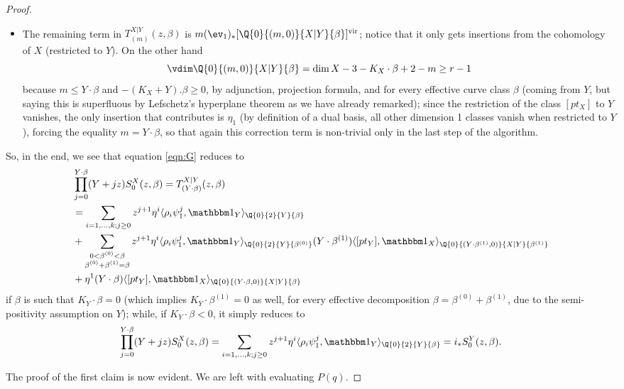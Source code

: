 \begin{proof}
\begin{itemize}[leftmargin=*]
\item The remaining term in $T_{(m)}^{X|Y}(z,\beta)$ is $m(\ev_1)_*[\Q{0}{(m,0)}{X|Y}{\beta}]^\text{vir}$; notice that it only gets insertions from the cohomology of $X$ (restricted to $Y$). On the other hand
\[
 \vdim \Q{0}{(m,0)}{X|Y}{\beta}=\dim X-3 -K_X \cdot \beta +2-m \geq r-1
\]
because $m\leq Y\cdot\beta$ and $-(K_X+Y).\beta\geq 0$, by adjunction, projection formula, and for every effective curve class $\beta$ (coming from $Y$, but saying this is superfluous by Lefschetz's hyperplane theorem as we have already remarked); since the restriction of the class $[pt_X]$ to $Y$ vanishes, the only insertion that contributes is $\eta_1$ (by definition of a dual basis, all other dimension 1 classes vanish when restricted to $Y$), forcing the equality $m=Y\cdot\beta$, so that again this correction term is non-trivial only in the last step of the algorithm.
\end{itemize}
So, in the end, we see that equation \ref{eqn:G} reduces to
\begin{align*}
 &\prod_{j=0}^{Y\cdot\beta}(Y+jz) S_0^X(z,\beta) = T_{(Y\cdot\beta)}^{X|Y}(z,\beta) \\
 &= \sum_{i=1,\ldots,k;j\geq 0}z^{j+1}\eta^i\langle \rho_i\psi_1^j,\mathbbm 1_{Y}\rangle_{\Q{0}{2}{Y}{\beta}} \\
 &+\sum_{\substack{0<\beta^{(0)}<\beta \\ \beta^{(0)}+\beta^{(1)}=\beta}}z^{j+1}\eta^i\langle \rho_i\psi_1^j,\mathbbm 1_{Y}\rangle_{\Q{0}{2}{Y}{\beta^{(0)}}}(Y\cdot\beta^{(1)})\langle [pt_Y],\mathbbm 1_{X}\rangle_{\Q{0}{(Y\cdot\beta^{(1)},0)}{X|Y}{\beta^{(1)}}}\\
 &+\eta^1(Y\cdot\beta)\langle [pt_Y],\mathbbm 1_{X}\rangle_{\Q{0}{(Y\cdot\beta,0)}{X|Y}{\beta}}
\end{align*}
if $\beta$ is such that $K_Y\cdot\beta=0$ (which implies $K_Y\cdot\beta^{(1)}=0$ as well, for every effective decomposition $\beta=\beta^{(0)}+\beta^{(1)}$, due to the semi-positivity assumption on $Y$); while, if $K_Y\cdot\beta<0$, it simply reduces to
\[
 \prod_{j=0}^{Y\cdot\beta}(Y+jz) S_0^X(z,\beta)= \sum_{i=1,\ldots,k;j\geq 0}z^{j+1}\eta^i\langle \rho_i\psi_1^j,\mathbbm 1_{Y}\rangle_{\Q{0}{2}{Y}{\beta}} = i_*S_0^Y(z,\beta).
\]


The proof of the first claim is now evident. We are left with evaluating $P(q)$.


\end{proof}
